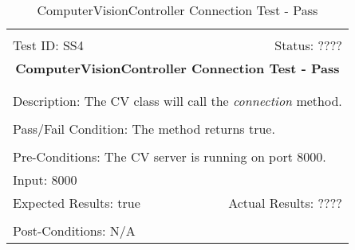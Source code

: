 \documentclass[11pt]{article}
\begin{document}
\begin{center}
\begin{table}[H]
\begin{tabular}{|l r|}\hline&\\[-2mm]
	Test ID: SS4	&Status: ????\\[-3mm]
	\multicolumn{2}{|c|}{\textbf{\large{ComputerVisionController Connection Test - Pass}}}\\&\\\hline&\\[-3mm]
	\multicolumn{2}{|p{\textwidth}|}{Description: The CV class will call the \textit{connection} method.}\\[1mm]\hline&\\[-3mm]
	\multicolumn{2}{|p{\textwidth}|}{Pass/Fail Condition: The method returns true.}\\[1mm]\hline&\\[-3mm]
	\multicolumn{2}{|p{\textwidth}|}{Pre-Conditions: The CV server is running on port 8000.}\\[4mm]
	\multicolumn{2}{|p{\textwidth}|}{Input: 8000}\\[2mm]\hline
	\multicolumn{1}{|p{0.49\textwidth}}{Expected Results: true}	&\multicolumn{1}{|p{0.45\textwidth}|}{Actual Results: ????}\\\hline&\\[-3mm]
	\multicolumn{2}{|p{\textwidth}|}{Post-Conditions: N/A}\\\hline
\end{tabular}
\caption{ComputerVisionController Connection Test - Pass}
\end{table}
\end{center}
\end{document}
